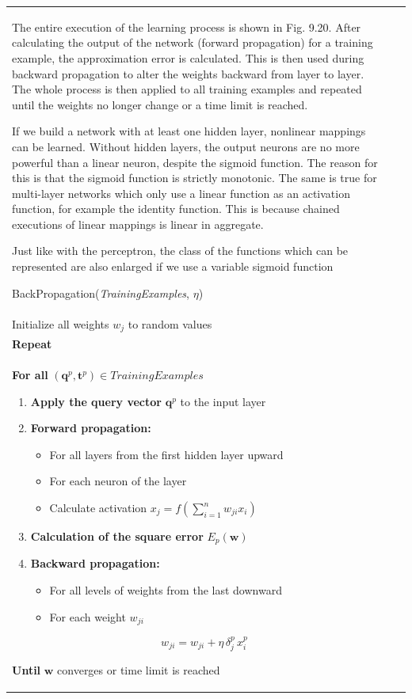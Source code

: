 \documentclass[10pt]{book}
\begin{document}
\begin{center}
\begin{tabular}{|l|l|l|}
The entire execution of the learning process is shown in Fig. 9.20. After calculating the output of the network (forward propagation) for a training example, the approximation error is calculated. This is then used during backward propagation to alter the weights backward from layer to layer. The whole process is then applied to all training examples and repeated until the weights no longer change or a time limit is reached.

If we build a network with at least one hidden layer, nonlinear mappings can be learned. Without hidden layers, the output neurons are no more powerful than a linear neuron, despite the sigmoid function. The reason for this is that the sigmoid function is strictly monotonic. The same is true for multi-layer networks which only use a linear function as an activation function, for example the identity function. This is because chained executions of linear mappings is linear in aggregate.

Just like with the perceptron, the class of the functions which can be represented are also enlarged if we use a variable sigmoid function

BackPropagation(\textit{TrainingExamples}, $\eta$)\\
Initialize all weights $w_{j}$ to random values\\
\textbf{Repeat}\\
\textbf{For all} $(\boldsymbol{q}^{p}, \boldsymbol{t}^{p}) \in \mathit{TrainingExamples}$
\begin{enumerate}
  \item \textbf{Apply the query vector} $\boldsymbol{q}^{p}$ to the input layer
  \item \textbf{Forward propagation:}
  \begin{itemize}
    \item For all layers from the first hidden layer upward
    \item For each neuron of the layer
    \item Calculate activation $x_{j}=f\left(\sum_{i=1}^{n} w_{j i} x_{i}\right)$
  \end{itemize}
  \item \textbf{Calculation of the square error} $E_{p}(\boldsymbol{w})$
  \item \textbf{Backward propagation:}
  \begin{itemize}
    \item For all levels of weights from the last downward
    \item For each weight $w_{j i}$
  \end{itemize}
  \[
  w_{j i}=w_{j i}+\eta\,\delta_{j}^{p}\,x_{i}^{p}
  \]
\end{enumerate}
\textbf{Until} $\boldsymbol{w}$ converges or time limit is reached


\end{tabular}
\end{center}
\end{document}
